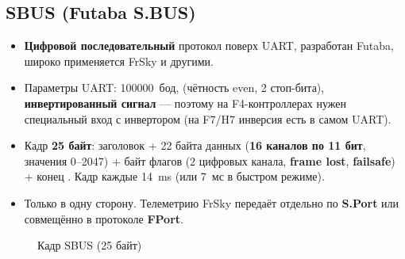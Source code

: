 \subsection{SBUS (Futaba S.BUS)}
\begin{itemize}
\item \textbf{Цифровой последовательный} протокол поверх UART, разработан Futaba, широко применяется FrSky и другими.
\item Параметры UART: \SI{100000}{бод},  (чётность even, 2 стоп-бита), \textbf{инвертированный сигнал} — поэтому на F4-контроллерах нужен специальный вход с инвертором (на F7/H7 инверсия есть в самом UART).
\item Кадр \textbf{25 байт}: заголовок  + 22 байта данных (\textbf{16 каналов по 11 бит}, значения 0–2047) + байт флагов (2 цифровых канала, \textbf{frame lost}, \textbf{failsafe}) + конец . Кадр каждые \SI{14}{\milli\second} (или 7~мс в быстром режиме).
\item Только в одну сторону. Телеметрию FrSky передаёт отдельно по \textbf{S.Port} или совмещённо в протоколе \textbf{FPort}.
\end{itemize}

\begin{figure}[H]\centering
{}
\caption{Кадр SBUS (25 байт)}
\end{figure}

